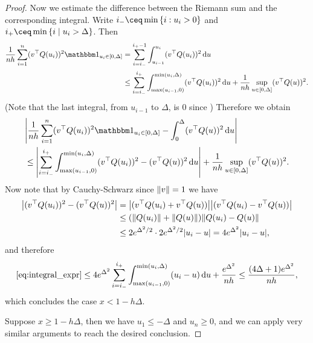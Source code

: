 \begin{proof}
Now we estimate the difference between the Riemann sum and the corresponding integral. Write $i_- \ceq \min\qty{i : u_i > 0}$ and $i_+ \ceq \min\qty{i \mid u_i > \Delta}$.  Then 
\begin{align*}
\frac1{nh} \sum_{i=1}^n (v\T Q(u_i))^2 \ind_{u_i \in [0, \Delta]} &= \sum_{i=i_-}^{i_+ -1 } \int_{u_{i-1}}^{u_i} (v\T Q(u_i))^2 \dd{u} \\
&\leq \sum_{i = i_-}^{i_+} \int_{\max(u_{i-1}, 0)}^{\min(u_i, \Delta)} (v\T Q(u_i))^2 \dd{u} + \frac1{nh} \sup_{u \in [0, \Delta]} (v\T Q(u))^2.
\end{align*}
(Note that the last integral, from $u_{i-1}$ to $\Delta$, is 0 since )
Therefore we obtain
\begin{align}
	&\abs{\frac{1}{nh} \sum_{i=1}^n (v\T Q(u_i))^2 \ind_{u_i \in [0, \Delta]} -  \int_0^\Delta (v\T Q(u))^2 \dd{u}} \nonumber \\
	&\leq \abs{\sum_{i = i_-}^{i_+} \int_{\max(u_{i-1}, 0)}^{\min(u_i, \Delta)}(v\T Q(u_i))^2 - (v\T Q(u))^2 \dd{u}} + \frac1{nh} \sup_{u \in [0, \Delta]} (v\T Q(u))^2. \label{eq:integral_expr}
\end{align}
Now note that by Cauchy-Schwarz since $\norm{v} = 1$ we have 
\begin{align*}
\abs{(v^\top Q(u_i))^2 - (v^\top Q(u))^2} &= \abs{(v^\top Q(u_i) + v^\top Q(u))}\abs{(v^\top Q(u_i) - v^\top Q(u))}\\
&\leq (\norm{Q(u_i)} + \norm{Q(u)}) \norm{Q(u_i) - Q(u)} \\
&\leq 2 e^{\Delta^2/2} \cdot 2e^{\Delta^2/2} \abs{u_i - u} = 4 e^{\Delta^2} \abs{u_i - u}, 
\end{align*}
and  therefore
\[
\eqref{eq:integral_expr} \leq 4e^{\Delta^2} \sum_{i=i_-}^{i_+} \int_{\max(u_{i-1}, 0)}^{\min(u_i, \Delta)}(u_i - u) \dd{u} + \frac{e^{\Delta^2}}{nh} \leq \frac{(4\Delta + 1) e^{\Delta^2}}{nh},
\]
which concludes the case $x < 1- h\Delta$. 

Suppose $x \geq 1 - h\Delta$, then we have $u_1 \leq -\Delta$ and $u_n \geq 0$, and we can apply very similar arguments to reach the desired conclusion. 
\end{proof}
